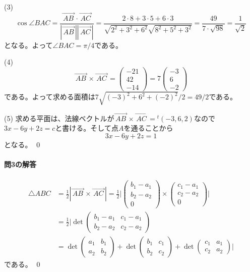 \noindent (3)
\[
\cos \angle BAC
= \frac{\overrightarrow{\,AB\,}\cdot\overrightarrow{\,AC\,}}{|\overrightarrow{\,AB\,}| |\overrightarrow{\,AC\,}|}
= \frac{2\cdot 8 + 3 \cdot 5 + 6 \cdot 3}{\sqrt{2^2 + 3^2 + 6^2}\sqrt{8^2 + 5^2 + 3^2}}
= \frac{49}{7 \cdot \sqrt{98}} = \frac{1}{\sqrt{2}}
\]
となる。よって$\angle BAC = \pi/4$である。

\noindent (4)
\[
\overrightarrow{\,AB\,}\times \overrightarrow{\,AC\,}
=
\begin{pmatrix}
-21 \\
42 \\
-14
\end{pmatrix}
= 
7
\begin{pmatrix}
-3 \\
6 \\
-2
\end{pmatrix}
\]
である。よって求める面積は$7\sqrt{(-3)^2 + 6^2 + (-2)^2}/2 = 49 / 2$である。

\noindent (5) 求める平面は、法線ベクトルが$\overrightarrow{\,AB\,}\times\overrightarrow{\,AC\,} = {}^t(-3, 6, 2)$なので$3x - 6y + 2z = c$と書ける。そして点$A$を通ることから
\[
3x - 6y + 2z = 1
\]
となる。 \qed

\paragraph{問3の解答}
\begin{align*}
\triangle ABC 
&= \frac{1}{2}|\overrightarrow{\,AB\,} \times \overrightarrow{\,AC\,}|
= \frac{1}{2} \biggl|
\begin{pmatrix}
b_1 - a_1 \\
b_2 - a_2 \\
0
\end{pmatrix}
\times
\begin{pmatrix}
c_1 - a_1 \\
c_2 - a_2 \\
0
\end{pmatrix} \biggr|\\
&= \frac{1}{2} \biggl| \det
\begin{pmatrix}
b_1 - a_1 & c_1 - a_1 \\
b_2 - a_2 & c_2 - a_2
\end{pmatrix} \\
&=
\det \begin{pmatrix}
a_1 & b_1 \\
a_2 & b_2
\end{pmatrix}
+
\det \begin{pmatrix}
b_1 & c_1 \\
b_2 & c_2
\end{pmatrix}
+
\det \begin{pmatrix}
c_1 & a_1 \\
c_2 & a_2
\end{pmatrix} \biggr|
\end{align*}
である。 \qed

